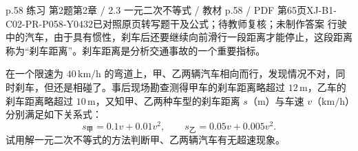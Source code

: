 \par\noindent\begin{minipage}{\linewidth}
\begin{bankitem}{p.58 练习 第2题}{第2章 / 2.3 一元二次不等式 / 教材 p.58 / PDF 第65页}{XJ-B1-C02-PR-P058-Y0432}{已对照原页转写题干及公式；待教师复核；未制作答案}
行驶中的汽车，由于具有惯性，刹车后还要继续向前滑行一段距离才能停止，这段距离称为“刹车距离”。刹车距离是分析交通事故的一个重要指标。
\par 在一个限速为 $40\,\mathrm{km/h}$ 的弯道上，甲、乙两辆汽车相向而行，发现情况不对，同时刹车，但还是相碰了。事后现场勘查测得甲车的刹车距离略超过 $12\,\mathrm m$，乙车的刹车距离略超过 $10\,\mathrm m$，又知甲、乙两种车型的刹车距离 $s$（$\mathrm m$）与车速 $v$（$\mathrm{km/h}$）分别满足如下关系式：
\[s_{\text{甲}}=0.1v+0.01v^2,\qquad s_{\text{乙}}=0.05v+0.005v^2.\]
试用解一元二次不等式的方法判断甲、乙两辆汽车有无超速现象。
\end{bankitem}
\end{minipage}\par\medskip
